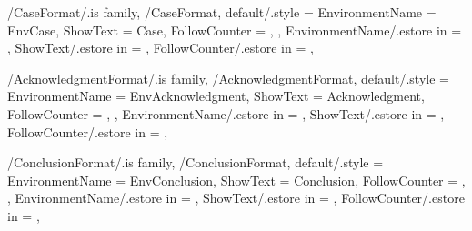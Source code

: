 
\pgfkeys
{
  /CaseFormat/.is family, /CaseFormat,
  default/.style =
  {
    EnvironmentName = {EnvCase},
    ShowText = {Case},
    FollowCounter = \empty,
  },
  EnvironmentName/.estore in = \GetCaseFormatEnvironmentName,
  ShowText/.estore in = \GetCaseFormatShowText,
  FollowCounter/.estore in = \GetCaseFormatFollowCounter,
} %

\newcommand{\InsertCase}[1]
{%
  \InsertTheoremContent[\empty]{\GetCaseFormatEnvironmentName}{#1}%
} %

\newcommand{\InitCaseFormat}
{%
  \ifthenelse{\equal{\GetCaseFormatFollowCounter}{\empty}}
  {%
    \newtheorem*{%
      \GetCaseFormatEnvironmentName}{\GetCaseFormatShowText}
  }%
  {%
    \newtheorem{%
      \GetCaseFormatEnvironmentName}{%
      \GetCaseFormatShowText}[\GetCaseFormatFollowCounter]%
  }%
} %


\pgfkeys
{
  /AcknowledgmentFormat/.is family, /AcknowledgmentFormat,
  default/.style =
  {
    EnvironmentName = {EnvAcknowledgment},
    ShowText = {Acknowledgment},
    FollowCounter = \empty,
  },
  EnvironmentName/.estore in = \GetAcknowledgmentFormatEnvironmentName,
  ShowText/.estore in = \GetAcknowledgmentFormatShowText,
  FollowCounter/.estore in = \GetAcknowledgmentFormatFollowCounter,
} %

\newcommand{\InsertAcknowledgment}[1]
{%
  \InsertTheoremContent[\empty]{\GetAcknowledgmentFormatEnvironmentName}{#1}%
} %

\newcommand{\InitAcknowledgmentFormat}
{%
  \ifthenelse{\equal{\GetAcknowledgmentFormatFollowCounter}{\empty}}
  {%
    \newtheorem*{%
      \GetAcknowledgmentFormatEnvironmentName}{\GetAcknowledgmentFormatShowText}
  }%
  {%
    \newtheorem{%
      \GetAcknowledgmentFormatEnvironmentName}{%
      \GetAcknowledgmentFormatShowText}[\GetAcknowledgmentFormatFollowCounter]%
  }%
} %


\pgfkeys
{
  /ConclusionFormat/.is family, /ConclusionFormat,
  default/.style =
  {
    EnvironmentName = {EnvConclusion},
    ShowText = {Conclusion},
    FollowCounter = \empty,
  },
  EnvironmentName/.estore in = \GetConclusionFormatEnvironmentName,
  ShowText/.estore in = \GetConclusionFormatShowText,
  FollowCounter/.estore in = \GetConclusionFormatFollowCounter,
} %

